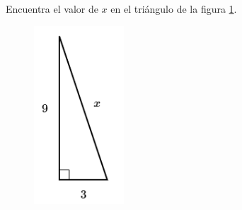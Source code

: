 \question[15]  Encuentra el valor de $x$ en el triángulo de la figura \ref{fig:lados_pitagoras_07}.
\begin{figure}[H]
    \begin{center}
        \includegraphics[width=0.3\textwidth]{../images/lados_pitagoras_07.png}
    \end{center}
    \caption{}
    \label{fig:lados_pitagoras_07}
\end{figure}